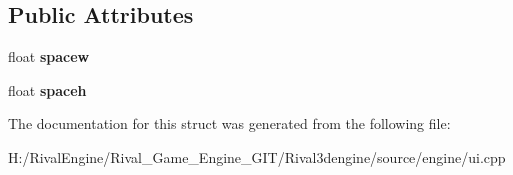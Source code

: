 \subsection*{Public Attributes}
\begin{DoxyCompactItemize}
\item 
\mbox{\label{struct_u_i_1_1_spacer_a2be3f2842ba6027d42f022ff90d89783}} 
float {\bfseries spacew}
\item 
\mbox{\label{struct_u_i_1_1_spacer_a84208206467abf73e8261dbbba237980}} 
float {\bfseries spaceh}
\end{DoxyCompactItemize}


The documentation for this struct was generated from the following file\+:\begin{DoxyCompactItemize}
\item 
H\+:/\+Rival\+Engine/\+Rival\+\_\+\+Game\+\_\+\+Engine\+\_\+\+G\+I\+T/\+Rival3dengine/source/engine/ui.\+cpp\end{DoxyCompactItemize}
